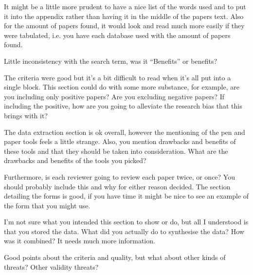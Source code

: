 \documentclass[times, 10pt,twocolumn]{article}
\begin{document}

It might be a little more prudent to have a nice list of the words used and to put it into the appendix rather than having it in the middle of the papers text. Also for the amount of papers found, it would look and read much more easily if they were tabulated, i.e. you have each database used with the amount of papers found.

Little inconsistency with the search term, was it ``Benefits'' or benefits?


The criteria were good but it's a bit difficult to read when it's all put into a single block. This section could do with some more substance, for example, are you including only positive papers? Are you excluding negative papers? If including the positive, how are you going to alleviate the research bias that this brings with it?


The data extraction section is ok overall, however the mentioning of the pen and paper tools feels a little strange. Also, you mention drawbacks and benefits of these tools and that they should be taken into consideration. What are the drawbacks and benefits of the tools you picked?

Furthermore, is each reviewer going to review each paper twice, or once? You should probably include this and why for either reason decided. The section detailing the forms is good, if you have time it might be nice to see an example of the form that you might use.

I'm not sure what you intended this section to show or do, but all I understood is that you stored the data. What did you actually do to synthesise the data? How was it combined? It needs much more information.

Good points about the criteria and quality, but what about other kinds of threats? Other validity threats?
\end{document}
